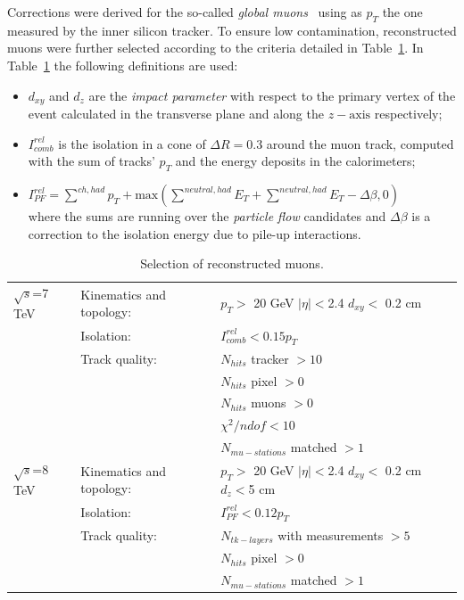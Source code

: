 Corrections were derived for the so-called {\it global
  muons}~\cite{Chatrchyan:2013sba} using as $p_T$ the one measured by
the inner silicon tracker. To ensure low contamination, reconstructed
muons were further selected according to the criteria detailed in
Table~\ref{tab:muon_selection}. In Table~\ref{tab:muon_selection} the following
definitions are used:
\begin{itemize}
\item $d_{xy}$ and $d_{z}$ are the \textit{impact parameter} with respect to the 
primary vertex of the event calculated in the transverse 
plane and along the $z-\mathrm{axis}$ respectively;
\item $I^{rel}_{comb}$ is the isolation in a cone of $\Delta R =0.3$ around the muon 
track, computed with the sum of tracks' $p_{T}$ and the energy deposits in the calorimeters;
\item $I^{rel}_{PF}=\sum ^{ch,had}p_{T}+\mathrm{max}\left( \sum ^{neutral,had}E_{T} + \sum ^{neutral,had}E_{T} -\Delta\beta ,0 \right)$ \\
where the sums are running over the \textit{particle flow} \cite{CMS:2010aua} candidates and 
$\Delta \beta$ is a correction to the isolation energy due to pile-up interactions. 
\end{itemize}

\begin{table}[hbH]
\begin{center}
\caption{Selection of reconstructed muons.\label{tab:muon_selection}}
\begin{tabular}{|l|ll|}
\hline
$\sqrt{s}$=7 TeV & Kinematics and topology:& $p_T>$ 20 GeV $|\eta|<$2.4 $d_{xy}<$ 0.2 cm \\
                 & Isolation: & $I^{rel}_{comb}<0.15 p_T$ \\
                 & Track quality: & $N_{hits}$  tracker $>10$ \\ && $N_{hits}$ pixel $>0$ \\&& $N_{hits}$ muons $>0$ \\&&  $\chi^2/ndof < 10$ \\
& & $N_{mu-stations}$ matched $>1$  \\
\hline
$\sqrt{s}$=8 TeV & Kinematics and topology:& $p_T>$ 20 GeV $|\eta|<$2.4 $d_{xy}<$ 0.2 cm $d_{z}<$5 cm \\
& Isolation: & $I^{rel}_{PF}<0.12 p_T$ \\
& Track quality: & $N_{tk-layers}$ with measurements $>5$  \\ && $N_{hits}$ pixel $>0$\\
& & $N_{mu-stations}$ matched $>1$  \\
\hline
\end{tabular}
\end{center}
\end{table}

